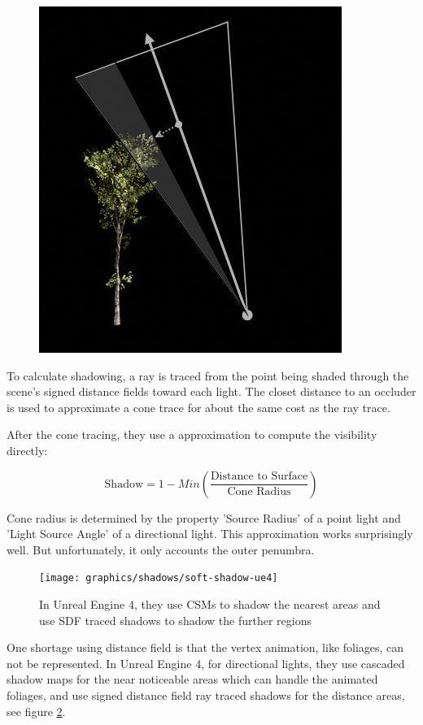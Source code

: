 \begin{figure}
	\includegraphics{graphics/shadows/ConeTrace}
	\label{f:ConeTrace}
\end{figure}


To calculate shadowing, a ray is traced from the point being shaded through the scene's signed distance fields toward each light. The closet distance to an occluder is used to approximate a cone trace for about the same cost as the ray trace.

After the cone tracing, they use a approximation to compute the visibility directly:

\begin{equation}
	\text{Shadow}=1-Min(\frac{\text{Distance to Surface}}{\text{Cone Radius}})
\end{equation}

Cone radius is determined by the property 'Source Radius' of a point light and 'Light Source Angle' of a directional light. This approximation works surprisingly well. But unfortunately, it only accounts the outer penumbra.

\begin{figure}\label{f:soft-shadow-ue4}
	\texttt{[image: graphics/shadows/soft-shadow-ue4]}
	\caption{In Unreal Engine 4, they use CSMs to shadow the nearest areas and use SDF traced shadows to shadow the further regions}
\end{figure}

One shortage using distance field is that the vertex animation, like foliages, can not be represented. In Unreal Engine 4, for directional lights, they use cascaded shadow maps for the near noticeable areas which can handle the animated foliages, and use signed distance field ray traced shadows for the distance areas, see figure \ref{f:soft-shadow-ue4}.


